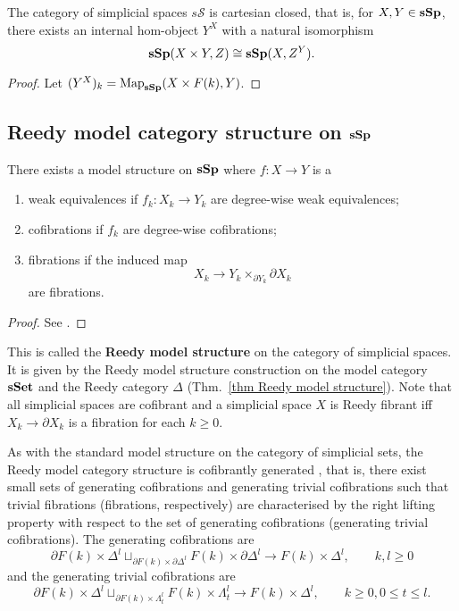 \begin{refsection}
\begin{prop}
The category of simplicial spaces $s\mathcal{S}$ is cartesian closed, that is, for $X,Y\in \mathbf{sSp}$, there exists an internal hom-object $Y^X$ with a natural isomorphism
$$\mathbf{sSp}(X\times Y,Z)\cong \mathbf{sSp}(X,Z^Y).$$
\end{prop}
\begin{proof}
Let $(Y^X)_k=\operatorname{\mathrm{Map}}_{\mathbf{sSp}}(X\times F(k),Y)$.
\end{proof}

\subsection{Reedy model category structure on $\mathbf{sSp}$}
\begin{thm}
There exists a model structure on $\mathbf{sSp}$ where $f:X\to Y$ is a
\begin{enumerate}
\item weak equivalences if $f_k:X_k\to Y_k$ are degree-wise weak equivalences;
\item cofibrations if $f_k$ are degree-wise cofibrations;
\item fibrations if the induced map
\begin{equation} \label{Reedyfib}
X_k\to Y_k\times_{\partial Y_k}\partial X_k
\end{equation}
are fibrations.
\end{enumerate}
\end{thm}
\begin{proof}
See \cite[IV.3.2]{gj}.
\end{proof}

This is called the \textbf{Reedy model structure} on the category of simplicial spaces. It is given by the Reedy model structure construction on the model category $\mathbf{sSet}$ and the Reedy category $\Delta$ (Thm.~\ref{thm Reedy model structure}). Note that all simplicial spaces are cofibrant and a simplicial space $X$ is Reedy fibrant iff $X_k\to\partial X_k$ is a fibration for each $k\ge 0$.

As with the standard model structure on the category of simplicial sets, the Reedy model category structure is cofibrantly generated \cite{dhk}, that is, there exist small sets of generating cofibrations and generating trivial cofibrations such that trivial fibrations (fibrations, respectively) are characterised by the right lifting property with respect to the set of generating cofibrations (generating trivial cofibrations). The generating cofibrations are
$$\partial F(k)\times \Delta^l\sqcup_{\partial F(k)\times\partial\Delta^l}F(k)\times\partial\Delta^l\to F(k)\times\Delta^l,\qquad k,l\ge0$$
and the generating trivial cofibrations are
$$\partial F(k)\times \Delta^l\sqcup_{\partial F(k)\times\Lambda^l_t}F(k)\times\Lambda^l_t\to F(k)\times\Delta^l,\qquad k\ge0,0\le t\le l.$$


\end{refsection}

